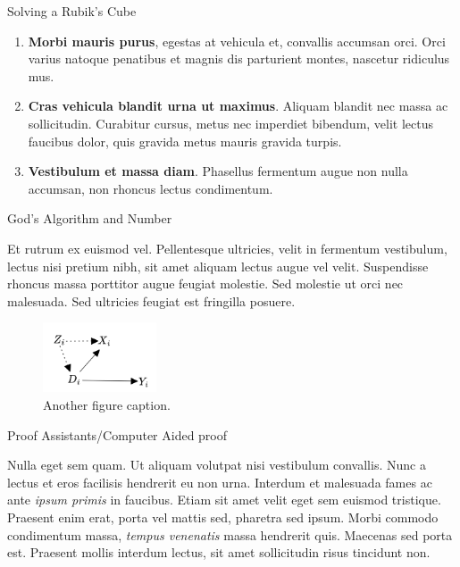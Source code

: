 \documentclass[final]{beamer}
\newlength{\colwidth}
\begin{document}
\begin{frame}[t]
\begin{columns}[t]
\begin{column}{\colwidth}
\begin{block}{Solving a Rubik's Cube}
    \begin{enumerate}
      \item \textbf{Morbi mauris purus}, egestas at vehicula et, convallis
        accumsan orci. Orci varius natoque penatibus et magnis dis parturient
        montes, nascetur ridiculus mus.
      \item \textbf{Cras vehicula blandit urna ut maximus}. Aliquam blandit nec
        massa ac sollicitudin. Curabitur cursus, metus nec imperdiet bibendum,
        velit lectus faucibus dolor, quis gravida metus mauris gravida turpis.
      \item \textbf{Vestibulum et massa diam}. Phasellus fermentum augue non
        nulla accumsan, non rhoncus lectus condimentum.
    \end{enumerate}

  \end{block}

  \begin{block}{God's Algorithm and Number}

    \large Et rutrum ex euismod vel. Pellentesque ultricies, velit in fermentum
    vestibulum, lectus nisi pretium nibh, sit amet aliquam lectus augue vel
    velit. Suspendisse rhoncus massa porttitor augue feugiat molestie. Sed
    molestie ut orci nec malesuada. Sed ultricies feugiat est fringilla
    posuere.

    \begin{figure}
      \centering
        \includegraphics[width=0.3\textwidth]{figures/dag.png}

      \caption{Another figure caption.}
    \end{figure}

  \end{block}

  \begin{block}{Proof Assistants/Computer Aided proof}

    \large Nulla eget sem quam. Ut aliquam volutpat nisi vestibulum convallis. Nunc a
    lectus et eros facilisis hendrerit eu non urna. Interdum et malesuada fames
    ac ante \textit{ipsum primis} in faucibus. Etiam sit amet velit eget sem
    euismod tristique. Praesent enim erat, porta vel mattis sed, pharetra sed
    ipsum. Morbi commodo condimentum massa, \textit{tempus venenatis} massa
    hendrerit quis. Maecenas sed porta est. Praesent mollis interdum lectus,
    sit amet sollicitudin risus tincidunt non.


\end{block}
\end{column}
\end{columns}
\end{frame}
\end{document}
